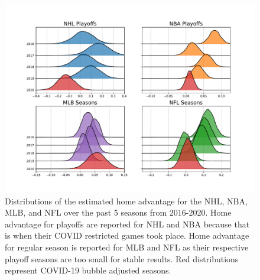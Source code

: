 \begin{figure}
	\centering
	\includegraphics[width=\textwidth]{figures/Figure_2.pdf}
	\caption{Distributions of the estimated home advantage for the NHL, NBA, MLB, and NFL over the past 5 seasons from 2016-2020. Home advantage for playoffs are reported for NHL and NBA because that is when their COVID restricted games took place. Home advantage for regular season is reported for MLB and NFL as their respective playoff seasons are too small for stable results. Red distributions represent COVID-19 bubble adjusted seasons.}
	\label{fig:ha_main}
\end{figure}